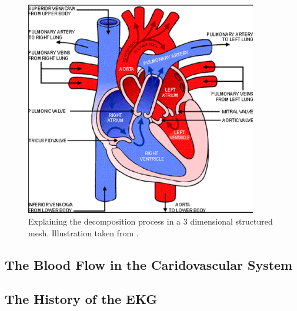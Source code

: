 \begin{figure}[h]
 \centering 
     \includegraphics[width=0.9\textwidth]{bilder/b_heart_structure_new}
     \caption{Explaining the decomposition process in a 3 dimensional structured mesh. Illustration taken from \cite{article9}.
     \label{b_heart_structure_new.png}}
\end{figure}


\subsection{The Blood Flow in the Caridovascular System}


\subsection{The History of the EKG}














